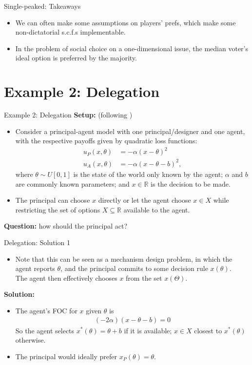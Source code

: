 \documentclass[english,10pt
,aspectratio=169
]{beamer}
\begin{document}
\begin{frame}{Single-peaked: Takeaways}
	\begin{itemize}
		\item We can often make some assumptions on players' prefs, which make some non-dictatorial s.c.f.s implementable.
		\item In the problem of social choice on a one-dimensional issue, the median voter's ideal option is preferred by the majority.
	\end{itemize}
\end{frame}



\section{Example 2: Delegation}

\begin{frame}{Example 2: Delegation}
	\textbf{Setup:} (following \cite{holmstrom_theory_1980})
	\begin{itemize}
		\item Consider a principal-agent model with one principal/designer and one agent, with the respective payoffs given by quadratic loss functions:
		\begin{align*}
			u_P(x,\theta) &= - \alpha (x-\theta)^2
			\\
			u_A(x,\theta) &= - \alpha (x-\theta-b)^2,
		\end{align*}
		where $\theta \sim U[0,1]$ is the state of the world only known by the agent; $\alpha$ and $b$ are commonly known parameters; and $x \in \mathbb{R}$ is the decision to be made.
		\item The principal can choose $x$ directly or let the agent choose $x \in X$ while restricting the set of options $X \subseteq \mathbb{R}$ available to the agent.
	\end{itemize}
	\textbf{Question:} how should the principal act?
\end{frame}


\begin{frame}{Delegation: Solution 1}
	\begin{itemize}
		\item Note that this can be seen as a mechanism design problem, in which the agent reports $\theta$, and the principal commits to some decision rule $x(\theta)$. \\
		The agent then effectively chooses $x$ from the set $x(\Theta)$.
	\end{itemize}
	\textbf{Solution:}
	\begin{itemize}
		\item The agent's FOC for $x$ given $\theta$ is 
		\begin{align*}
			(-2\alpha) (x-\theta-b) = 0
		\end{align*}
		So the agent selects $x^*(\theta) = \theta+b$ if it is available; $x \in X$ closest to $x^*(\theta)$ otherwise.
		\item The principal would ideally prefer $x_P(\theta) = \theta$.
	\end{itemize}
\end{frame}
\end{document}

